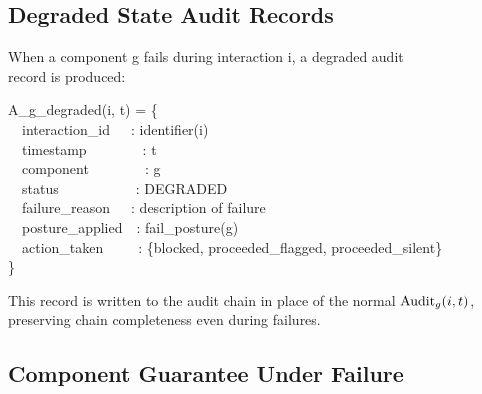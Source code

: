 \subsection{Degraded State Audit Records}


\begin{cdef}
\begin{claddisp}
When a component g fails during interaction i, a degraded audit\\
record is produced:\\
\end{claddisp}
\begin{cladnote}
A\_g\_degraded(i, t) = \{\\
~~interaction\_id~~~: identifier(i)\\
~~timestamp~~~~~~~~: t\\
~~component~~~~~~~~: g\\
~~status~~~~~~~~~~~: DEGRADED\\
~~failure\_reason~~~: description of failure\\
~~posture\_applied~~: fail\_posture(g)\\
~~action\_taken~~~~~: \{blocked, proceeded\_flagged, proceeded\_silent\}\\
\}\\
\end{cladnote}
This record is written to the audit chain in place of the normal $\operatorname{Audit}_g(i,t)$, preserving chain completeness even during failures.

\end{cdef}


\subsection{Component Guarantee Under Failure}


